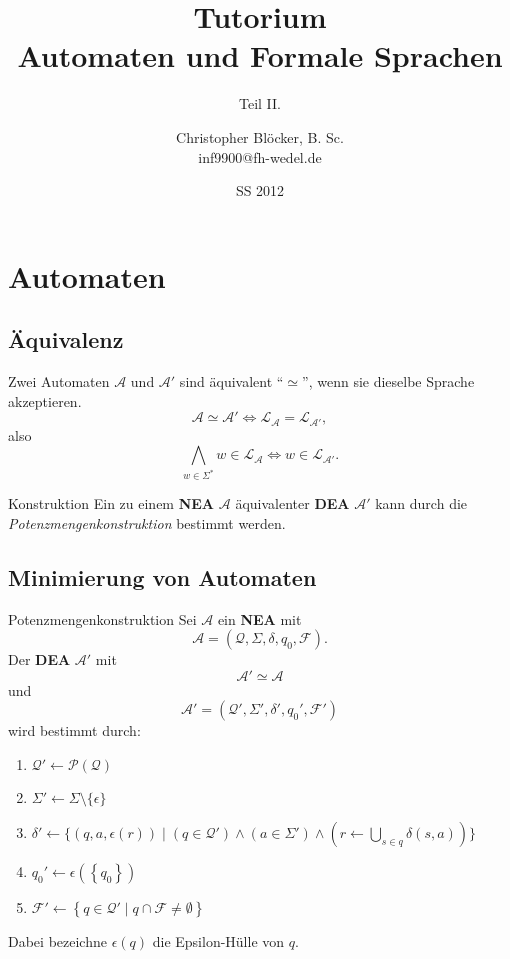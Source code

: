 \documentclass[]{beamer}
\author[Christopher Blöcker, B. Sc.]{Christopher Blöcker, B. Sc.\\ inf9900@fh-wedel.de}
\title[AFS Tutorium]{Tutorium\\Automaten und Formale Sprachen}
\date{SS 2012}
\subtitle{Teil II.}
\begin{document}
\begin{frame}
  \titlepage
\end{frame}

\section{Automaten}
\subsection{Äquivalenz}
\begin{frame}[squeeze]{}
  \begin{definition}
    Zwei Automaten $\mathcal{A}$ und $\mathcal{A'}$ sind äquivalent \enquote{$\simeq$}, wenn sie dieselbe Sprache akzeptieren.
    \[\mathcal{A \simeq A' \Leftrightarrow L_A = L_{A'}},\]
    also
    \[\bigwedge_{w \in \Sigma^*} w \in \mathcal{L_A} \Leftrightarrow w \in \mathcal{L_{A'}}.\]
  \end{definition}
  
  \pause
  
  \begin{exampleblock}{Konstruktion}
    Ein zu einem \textbf{NEA} $\mathcal{A}$ äquivalenter \textbf{DEA} $\mathcal{A'}$ kann durch die \textit{Potenzmengenkonstruktion} bestimmt werden.
  \end{exampleblock}
\end{frame}

\subsection{Minimierung von Automaten}
\begin{frame}[squeeze]{}
  \begin{exampleblock}{Potenzmengenkonstruktion}
    Sei $\mathcal{A}$ ein \textbf{NEA} mit
    \[\mathcal{A} = \left( \mathcal{Q}, \Sigma, \delta, q_0, \mathcal{F} \right).\]
    \pause
    Der \textbf{DEA} $\mathcal{A'}$ mit
    \[\mathcal{A' \simeq A}\]
    und
    \[\mathcal{A'} = \left( \mathcal{Q'}, \Sigma', \delta', q_0', \mathcal{F'} \right)\]
    wird bestimmt durch:
    \pause
    \begin{enumerate}
      \item $\mathcal{Q'} \leftarrow \mathcal{P \left( Q \right)}$
      \pause
      \item $\Sigma' \leftarrow \Sigma \setminus \{\epsilon\}$
      \pause
      \item $\delta' \leftarrow \{ \left( q, a, \epsilon \left( r \right) \right) \; | \; \left( q \in \mathcal{Q'} \right) \wedge \left( a \in \Sigma' \right) \wedge ( r \leftarrow \underset{s \in q}{\bigcup} \delta \left( s, a \right) )\}$
      \pause
      \item $q_0' \leftarrow \epsilon \left( \left\{ q_0 \right\} \right)$
      \pause
      \item $\mathcal{F'} \leftarrow \left\{ q \in \mathcal{Q'} \; | \; q \cap \mathcal{F} \neq \emptyset \right\}$
    \end{enumerate}
    \vspace*{0.5em}
    Dabei bezeichne $\epsilon \left( q \right)$ die Epsilon-Hülle von $q$.
  \end{exampleblock}
\end{frame}
\end{document}
